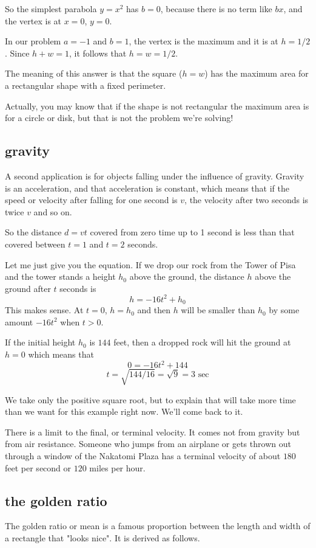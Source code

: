 \documentclass[11pt, oneside]{article}
\begin{document}
So the simplest parabola $y = x^2$ has $b = 0$, because there is no term like $bx$, and the vertex is at $x = 0$, $y = 0$.

In our problem $a = -1$ and $b = 1$, the vertex is the maximum and it is at $h = 1/2$.   Since $h + w = 1$, it follows that $h = w = 1/2$.

The meaning of this answer is that the square ($h = w$) has the maximum area for a rectangular shape with a fixed perimeter.

Actually, you may know that if the shape is not rectangular the maximum area is for a circle or disk, but that is not the problem we're solving!

\subsection*{gravity}

A second application is for objects falling under the influence of gravity.  Gravity is an acceleration, and that acceleration is constant, which means that if the speed or velocity after falling for one second is $v$, the velocity after two seconds is twice $v$ and so on.  

So the distance $d = vt$ covered from zero time up to 1 second is less than that covered between $t = 1$ and $t = 2$ seconds.  

Let me just give you the equation.  If we drop our rock from the Tower of Pisa and the tower stands a height $h_0$ above the ground, the distance $h$ above the ground after $t$ seconds is
\[ h = -16t^2 + h_0 \]
This makes sense.  At $t = 0$, $h = h_0$ and then $h$ will be smaller than $h_0$ by some amount $-16t^2$ when $t > 0$.

If the initial height $h_0$ is $144$ feet, then a dropped rock will hit the ground at $h=0$ which means that
\[ 0 = -16t^2 + 144 \]
\[ t = \sqrt{144/16} = \sqrt{9} = 3 \text{ sec} \]

We take only the positive square root, but to explain that will take more time than we want for this example right now.  We'll come back to it.

There is a limit to the final, or terminal velocity.  It comes not from gravity but from air resistance.  Someone who jumps from an airplane or gets thrown out through a window of the Nakatomi Plaza has a terminal velocity of about $180$ feet per second or $120$ miles per hour.

\subsection*{the golden ratio}
The golden ratio or mean is a famous proportion between the length and width of a rectangle that "looks nice".  It is derived as follows.
\end{document}

